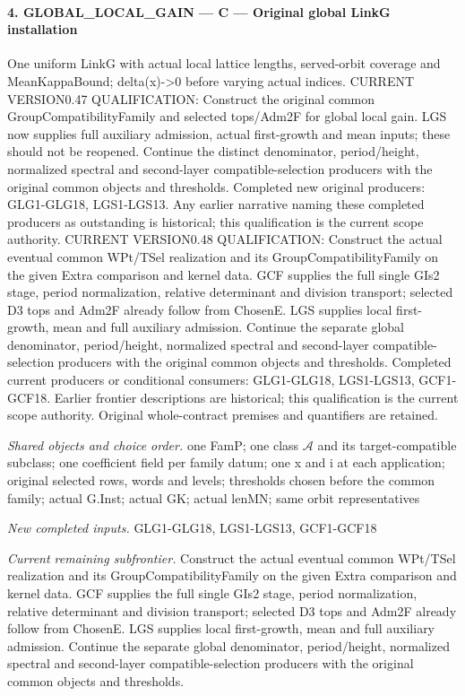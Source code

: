 \paragraph{4. GLOBAL\_\allowbreak LOCAL\_\allowbreak GAIN — C — Original global LinkG installation}

One uniform LinkG with actual local lattice lengths, served-orbit coverage and MeanKappaBound; delta(x)->0 before varying actual indices. CURRENT VERSION0.47 QUALIFICATION: Construct the original common GroupCompatibilityFamily and selected tops/Adm2F for global local gain. LGS now supplies full auxiliary admission, actual first-growth and mean inputs; these should not be reopened. Continue the distinct denominator, period/height, normalized spectral and second-layer compatible-selection producers with the original common objects and thresholds. Completed new original producers: GLG1-GLG18, LGS1-LGS13. Any earlier narrative naming these completed producers as outstanding is historical; this qualification is the current scope authority. CURRENT VERSION0.48 QUALIFICATION: Construct the actual eventual common WPt/TSel realization and its GroupCompatibilityFamily on the given Extra comparison and kernel data. GCF supplies the full single GIs2 stage, period normalization, relative determinant and division transport; selected D3 tops and Adm2F already follow from ChosenE. LGS supplies local first-growth, mean and full auxiliary admission. Continue the separate global denominator, period/height, normalized spectral and second-layer compatible-selection producers with the original common objects and thresholds. Completed current producers or conditional consumers: GLG1-GLG18, LGS1-LGS13, GCF1-GCF18. Earlier frontier descriptions are historical; this qualification is the current scope authority. Original whole-contract premises and quantifiers are retained.

\emph{Shared objects and choice order.} one FamP; one class $\mathcal A$ and its target-compatible subclass; one coefficient field per family datum; one x and i at each application; original selected rows, words and levels; thresholds chosen before the common family; actual G.Inst; actual GK; actual lenMN; same orbit representatives

\emph{New completed inputs.} GLG1-GLG18, LGS1-LGS13, GCF1-GCF18

\emph{Current remaining subfrontier.} Construct the actual eventual common WPt/TSel realization and its GroupCompatibilityFamily on the given Extra comparison and kernel data. GCF supplies the full single GIs2 stage, period normalization, relative determinant and division transport; selected D3 tops and Adm2F already follow from ChosenE. LGS supplies local first-growth, mean and full auxiliary admission. Continue the separate global denominator, period/height, normalized spectral and second-layer compatible-selection producers with the original common objects and thresholds.

